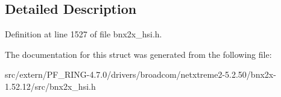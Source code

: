\subsection{Detailed Description}


Definition at line 1527 of file bnx2x\_\-hsi.h.



The documentation for this struct was generated from the following file:\begin{DoxyCompactItemize}
\item 
src/extern/PF\_\-RING-\/4.7.0/drivers/broadcom/netxtreme2-\/5.2.50/bnx2x-\/1.52.12/src/bnx2x\_\-hsi.h\end{DoxyCompactItemize}
